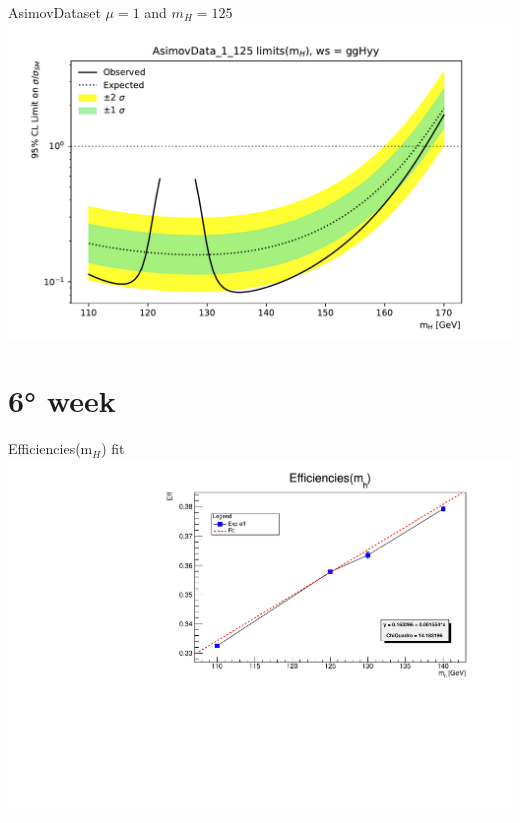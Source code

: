\documentclass[10pt,UKenglish, leqno, xcolor = dvipsnames]{beamer}
\begin{document}
		\begin{frame}{AsimovDataset $\mu=1$ and $m_H=125$}
			\vfill
			\includegraphics[width=1.\textwidth]{../images/plot_AsimovData_1_125_ggHyy.pdf}
			\vfill
		\end{frame}
	
	\section{6° week}
	\SectionPage
		
		\begin{frame}{Efficiencies(m$_H$) fit}
			\vfill
			\includegraphics[width=1.\textwidth]{../images/efficiencies_fit_1.pdf}
			\vfill
		\end{frame}
	
\end{document}
